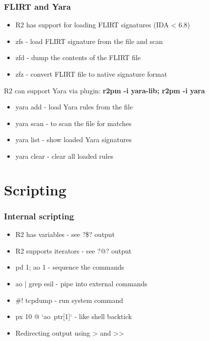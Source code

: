 \documentclass[10pt,pdf,utf8,english,compress,hyperref={unicode}]{beamer}
\begin{document}
\begin{frame}[fragile]
  \frametitle{FLIRT and Yara}
  \begin{itemize}
	  \item R2 has support for loading FLIRT signatures (IDA < 6.8)
	  \item \alert{zfs} - load FLIRT signature from the file and scan
	  \item \alert{zfd} - dump the contents of the FLIRT file
	  \item \alert{zfz} - convert FLIRT file to native signature format
  \end{itemize}
  R2 can support Yara via plugin: \textbf{r2pm -i yara-lib; r2pm -i yara}
  \begin{itemize}
	  \item \alert{yara add} - load Yara rules from the file
	  \item \alert{yara scan} - to scan the file for matches
	  \item \alert{yara list} - show loaded Yara signatures
	  \item \alert{yara clear} - clear all loaded rules
  \end{itemize}
\end{frame}

\section{Scripting}

\begin{frame}[fragile]
  \frametitle{Internal scripting}
  \begin{itemize}
	  \item R2 has variables - see \alert{?\$?} output
	  \item R2 supports iterators - see \alert{?@?} output
	  \item \alert{pd 1; ao 1} - sequence the commands
	  \item \alert{ao | grep esil} - pipe into external commands
	  \item \alert{\#! tcpdump} - run system command
	  \item \alert{px 10 @ `ao~ptr[1]`} - like shell backtick
	  \item Redirecting output using \alert{>} and \alert{>>}
  \end{itemize}
\end{frame}
\end{document}
